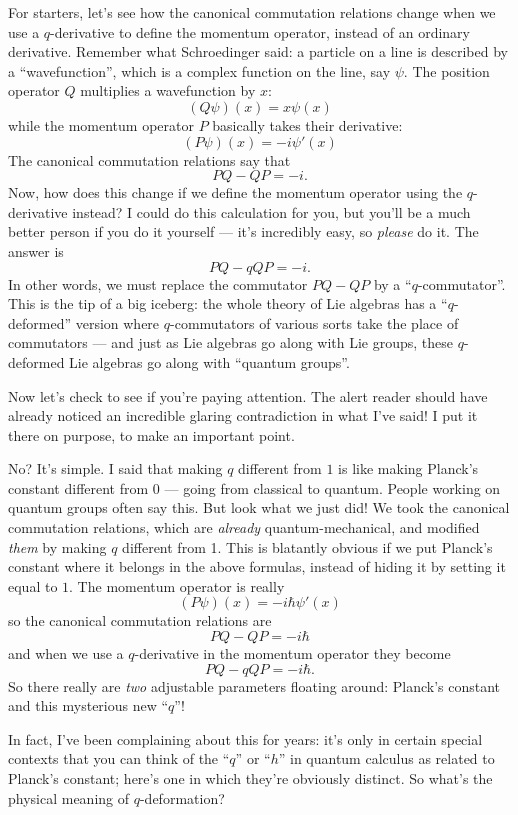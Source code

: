 \documentclass{article}
\begin{document}
For starters, let's see how the canonical commutation relations change
when we use a \(q\)-derivative to define the momentum operator, instead
of an ordinary derivative. Remember what Schroedinger said: a particle
on a line is described by a ``wavefunction'', which is a complex
function on the line, say \(\psi\). The position operator \(Q\)
multiplies a wavefunction by \(x\): \[(Q \psi)(x) = x \psi(x)\] while
the momentum operator \(P\) basically takes their derivative:
\[(P \psi)(x) = -i \psi'(x)\] The canonical commutation relations say
that \[PQ - QP = -i.\] Now, how does this change if we define the
momentum operator using the \(q\)-derivative instead? I could do this
calculation for you, but you'll be a much better person if you do it
yourself --- it's incredibly easy, so \emph{please} do it. The answer is
\[PQ-qQP = -i.\] In other words, we must replace the commutator
\(PQ - QP\) by a ``\(q\)-commutator''. This is the tip of a big iceberg:
the whole theory of Lie algebras has a ``\(q\)-deformed'' version where
\(q\)-commutators of various sorts take the place of commutators --- and
just as Lie algebras go along with Lie groups, these \(q\)-deformed Lie
algebras go along with ``quantum groups''.

Now let's check to see if you're paying attention. The alert reader
should have already noticed an incredible glaring contradiction in what
I've said! I put it there on purpose, to make an important point.

No? It's simple. I said that making \(q\) different from \(1\) is like
making Planck's constant different from \(0\) --- going from classical
to quantum. People working on quantum groups often say this. But look
what we just did! We took the canonical commutation relations, which are
\emph{already} quantum-mechanical, and modified \emph{them} by making
\(q\) different from 1. This is blatantly obvious if we put Planck's
constant where it belongs in the above formulas, instead of hiding it by
setting it equal to \(1\). The momentum operator is really
\[(P \psi)(x) = -i \hbar \psi'(x)\] so the canonical commutation
relations are \[PQ - QP = -i \hbar\] and when we use a \(q\)-derivative
in the momentum operator they become \[PQ - qQP = -i \hbar.\] So there
really are \emph{two} adjustable parameters floating around: Planck's
constant and this mysterious new ``\(q\)''!

In fact, I've been complaining about this for years: it's only in
certain special contexts that you can think of the ``\(q\)'' or
``\(h\)'' in quantum calculus as related to Planck's constant; here's
one in which they're obviously distinct. So what's the physical meaning
of \(q\)-deformation?
\end{document}
